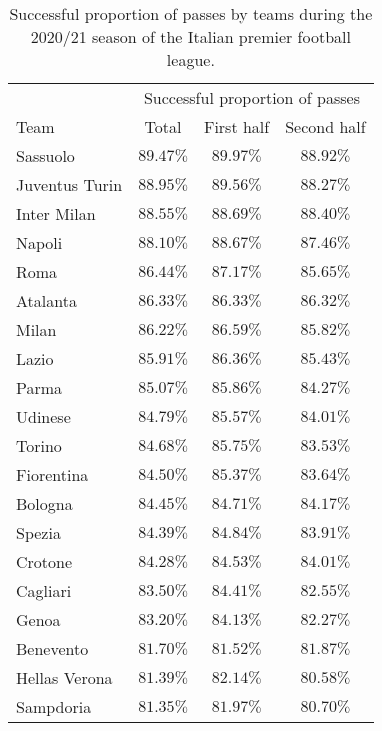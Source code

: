 \begin{table}[!htbp]
    \centering
        \caption{Successful proportion of passes by teams during the 2020/21 season of the Italian premier football league.
}\s

    \begin{tabular}{lc c c}
    \hline
          & \multicolumn{3}{c}{Successful proportion of passes}  \\
        Team & Total & First half & Second half \\
        \hline
Sassuolo& $89.47\%$ & $89.97\%$ & $88.92\%$ \\
Juventus Turin &$88.95\%$ & $89.56\%$ & $88.27\%$ \\
Inter Milan& $88.55\%$ & $88.69\%$ & $88.40\%$ \\
Napoli& $88.10\%$ & $88.67\%$ & $87.46\%$ \\
Roma& $86.44\%$ & $87.17\%$ & $85.65\%$ \\
Atalanta& $86.33\%$ & $86.33\%$ & $86.32\%$ \\
Milan & $86.22\%$ & $86.59\%$ & $85.82\%$ \\
Lazio & $85.91\%$ & $86.36\%$ & $85.43\%$ \\
Parma & $85.07\%$ & $85.86\%$ & $84.27\%$ \\
Udinese & $84.79\%$ & $85.57\%$ & $84.01\%$ \\
Torino & $84.68\%$ & $85.75\%$ & $83.53\%$ \\
Fiorentina & $84.50\%$ & $85.37\%$ & $83.64\%$ \\
Bologna & $84.45\%$ & $84.71\%$ & $84.17\%$ \\
Spezia & $84.39\%$ & $84.84\%$ & $83.91\%$ \\
Crotone & $84.28\%$ & $84.53\%$ & $84.01\%$ \\
Cagliari & $83.50\%$ & $84.41\%$ & $82.55\%$ \\
Genoa & $83.20\%$ & $84.13\%$ & $82.27\%$ \\
Benevento & $81.70\%$ & $81.52\%$ & $81.87\%$ \\
Hellas Verona & $81.39\%$ & $82.14\%$ & $80.58\%$ \\
Sampdoria & $81.35\%$ & $81.97\%$ & $80.70\%$ \\
   \hline
    \end{tabular}
    \label{tab:totalPass}
\end{table}
